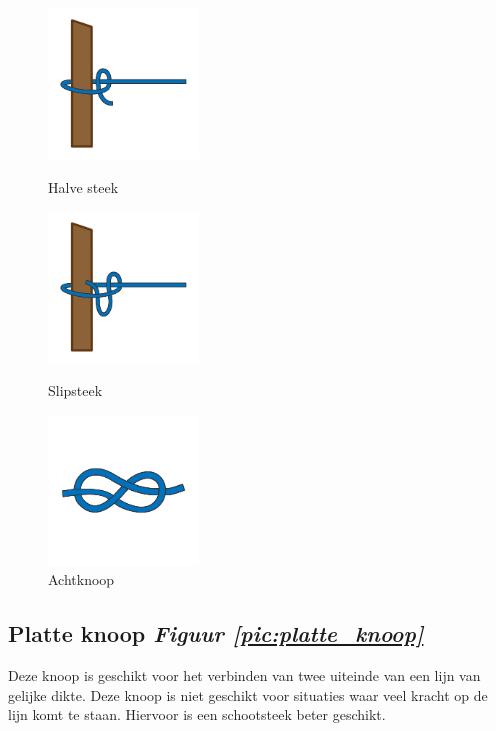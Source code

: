 \begin{figure}[h]
  \centering
  \begin{minipage}[b]{0.32\textwidth}
  \centering
    \includegraphics[height=4cm]{Hoofdstukken/Schiemannen/pdf/halve_steek.pdf}
    \caption{Halve steek}
    \label{pic:halve_steek}
  \end{minipage}
  \hfill
  \begin{minipage}[b]{0.32\textwidth}
    \centering
    \includegraphics[height=4cm]{Hoofdstukken/Schiemannen/pdf/slip_steek.pdf}
    \caption{Slipsteek}
    \label{pic:slip_steek}
    \end{minipage}
  \hfill
  \begin{minipage}[b]{0.32\textwidth}
    \centering
    \includegraphics[height=4cm]{Hoofdstukken/Schiemannen/pdf/achtknoop.pdf}
    \caption{Achtknoop}
    \label{pic:achtknoop}
  \end{minipage}
\end{figure}

\subsection{Platte knoop \hfill \textit{Figuur \ref{pic:platte_knoop}}}
Deze knoop is geschikt voor het verbinden van twee uiteinde van een lijn van gelijke dikte. Deze knoop is niet geschikt voor situaties waar veel kracht op de lijn komt te staan. Hiervoor is een schootsteek beter geschikt.
